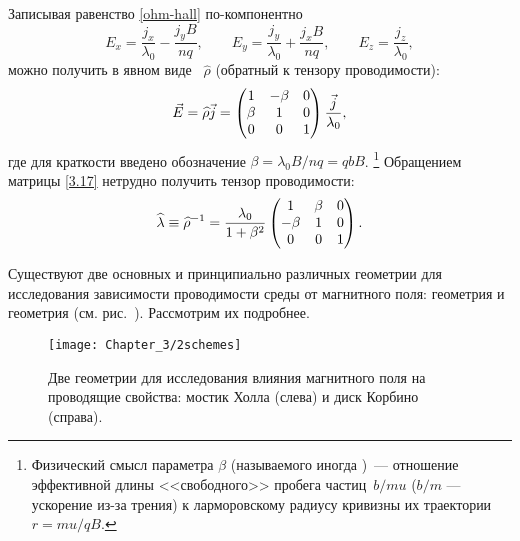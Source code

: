 Записывая равенство \eqref{ohm-hall} по-компонентно
\[
E_x = \frac{j_x}{\lambda_0}  -  \frac{j_y B}{nq} ,\qquad
    E_y = \frac{j_y}{\lambda_0} +  \frac{j_xB}{nq} ,\qquad
    E_z = \frac{j_z}{\lambda_0},
\]
можно получить в явном виде
~$\widehat{\rho}$ (обратный к тензору
проводимости):
\begin{equation}
    \vec{E}=\widehat{\rho}\vec{j}= \left(
    \begin{matrix}
        1 & -\beta & {0} \\
        \beta & 1 & {0} \\
        {0} &{0}& 1
    \end{matrix}
    \right)
    \frac{\vec{j}}{\lambda_0},
    \eqmark{3.17}
\end{equation}
где для краткости введено обозначение $\beta = \lambda_0 B / nq  = q b B$.%
\footnote{Физический смысл параметра $\beta$ (называемого иногда
)~--- отношение
эффективной длины <<свободного>> пробега частиц~$b/mu$
($b/m$ --- ускорение из-за трения) к ларморовскому радиусу кривизны их
траектории $r=mu/qB$.}
Обращением матрицы \eqref{3.17} нетрудно получить тензор проводимости:
\begin{equation}
    \widehat{\lambda}\equiv \widehat{\rho}^{-1}=
    \frac{\lambda_0}{1+\beta^2}\left(
    \begin{matrix}
        {1} & \beta & {0} \\
        -\beta & 1 & {0} \\
        {0} &{0}& 1 \\
    \end{matrix}
    \right).
    \eqmark{3.18}
\end{equation}


Существуют две основных и принципиально различных геометрии для исследования
зависимости проводимости среды от магнитного поля: геометрия  и геометрия  (см. рис.~).
Рассмотрим их подробнее.

\begin{figure}[h!]
    \texttt{[image: Chapter\_3/2schemes]}
    \caption{Две геометрии для исследования влияния магнитного поля на
проводящие свойства: мостик Холла (слева) и диск Корбино (справа).}
\end{figure}

